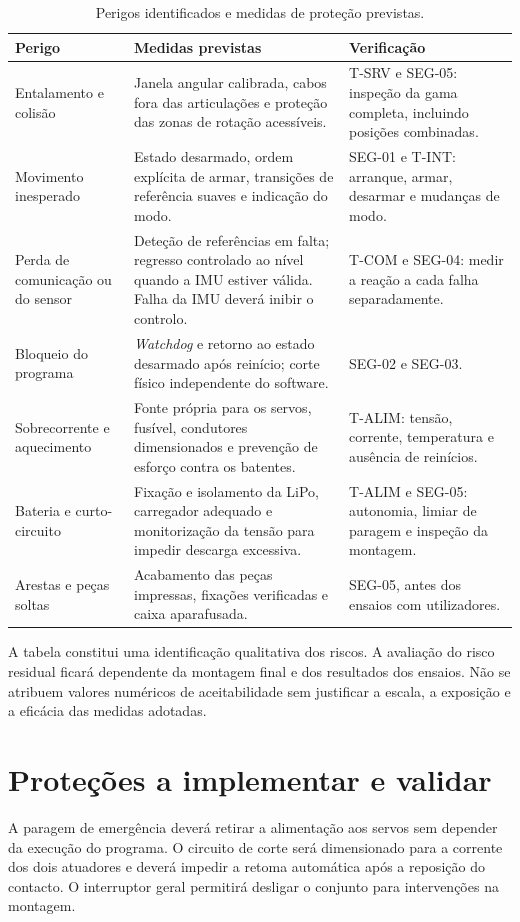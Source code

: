 \begin{table}[H]
\centering\small
\caption{Perigos identificados e medidas de proteção previstas.}
\begin{tabularx}{\textwidth}{p{2.5cm}YY}
\toprule
Perigo & Medidas previstas & Verificação\\\midrule
Entalamento e colisão & Janela angular calibrada, cabos fora das articulações e proteção das zonas de rotação acessíveis. & T-SRV e SEG-05: inspeção da gama completa, incluindo posições combinadas.\\
Movimento inesperado & Estado desarmado, ordem explícita de armar, transições de referência suaves e indicação do modo. & SEG-01 e T-INT: arranque, armar, desarmar e mudanças de modo.\\
Perda de comunicação ou do sensor & Deteção de referências em falta; regresso controlado ao nível quando a IMU estiver válida. Falha da IMU deverá inibir o controlo. & T-COM e SEG-04: medir a reação a cada falha separadamente.\\
Bloqueio do programa & \textit{Watchdog} e retorno ao estado desarmado após reinício; corte físico independente do software. & SEG-02 e SEG-03.\\
Sobrecorrente e aquecimento & Fonte própria para os servos, fusível, condutores dimensionados e prevenção de esforço contra os batentes. & T-ALIM: tensão, corrente, temperatura e ausência de reinícios.\\
Bateria e curto-circuito & Fixação e isolamento da LiPo, carregador adequado e monitorização da tensão para impedir descarga excessiva. & T-ALIM e SEG-05: autonomia, limiar de paragem e inspeção da montagem.\\
Arestas e peças soltas & Acabamento das peças impressas, fixações verificadas e caixa aparafusada. & SEG-05, antes dos ensaios com utilizadores.\\
\bottomrule
\end{tabularx}
\label{tab:riscos}
\end{table}

A tabela constitui uma identificação qualitativa dos riscos. A avaliação do risco residual ficará dependente da montagem final e dos resultados dos ensaios. Não se atribuem valores numéricos de aceitabilidade sem justificar a escala, a exposição e a eficácia das medidas adotadas.

\section{Proteções a implementar e validar}
A paragem de emergência deverá retirar a alimentação aos servos sem depender da execução do programa. O circuito de corte será dimensionado para a corrente dos dois atuadores e deverá impedir a retoma automática após a reposição do contacto. O interruptor geral permitirá desligar o conjunto para intervenções na montagem.

